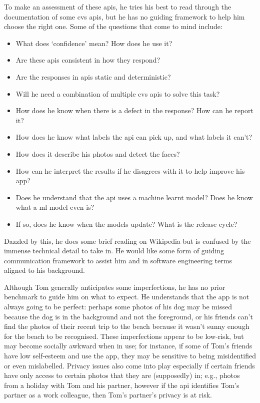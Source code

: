 

To make an assessment of these \glspl{api}, he tries his best to read through the documentation of some \gls{cvs} \glspl{api}, but he has no guiding framework to help him choose the right one. Some of the questions that come to mind include:

\begin{itemize}
  \item What does `confidence' mean? How does he use it?
  \item Are these \glspl{api} consistent in how they respond?
  \item Are the responses in \glspl{api} static and deterministic?
  \item Will he need a combination of multiple \gls{cvs} \glspl{api} to solve this task?
  \item How does he know when there is a defect in the response? How can he report it?
  \item How does he know what labels the \gls{api} can pick up, and what labels it can't?
  \item How does it describe his photos and detect the faces?
  \item How can he interpret the results if he disagrees with it to help improve his app?
  \item Does he understand that the \gls{api} uses a machine learnt model? Does he know what a \gls{ml} model even is?
  \item If so, does he know when the models update? What is the release cycle?
\end{itemize}

Dazzled by this, he does some brief reading on Wikipedia but is confused by the immense technical detail to take in. He would like some form of guiding communication framework to assist him and in software engineering terms aligned to his background.

Although Tom generally anticipates some imperfections, he has no prior benchmark to guide him on what to expect. He understands that the app is not always going to be perfect: perhaps some photos of his dog may be missed because the dog is in the background and not the foreground, or his friends can't find the photos of their recent trip to the beach because it wasn't sunny enough for the beach to be recognised. These imperfections appear to be low-risk, but may become socially awkward when in use; for instance, if some of Tom's friends have low self-esteem and use the app, they may be sensitive to being misidentified or even mislabelled. Privacy issues also come into play especially if certain friends have only access to certain photos that they are (supposedly) in; e.g., photos from a holiday with Tom and his partner, however if the \gls{api} identifies Tom's partner as a work colleague, then Tom's partner's privacy is at risk.

